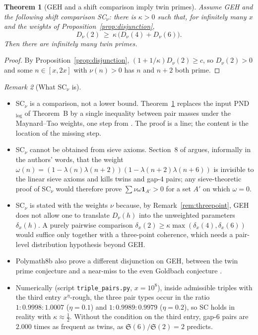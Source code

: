 \documentclass[11pt]{amsart}
\newtheorem{theorem}{Theorem}[section]
\theoremstyle{definition}
\theoremstyle{remark}
\newtheorem{remark}[theorem]{Remark}
\begin{document}
\begin{theorem}[GEH and a shift comparison imply twin primes]\label{thm:SC}
Assume GEH and the following \emph{shift comparison} SC$_\nu$: there is $\kappa>0$ such that, for infinitely many $x$ and the weights of Proposition~\ref{prop:disjunction},
\[
D_\nu(2)\ \ge\ \kappa\,\bigl(D_\nu(4)+D_\nu(6)\bigr).
\]
Then there are infinitely many twin primes.
\end{theorem}
\begin{proof}
By Proposition~\ref{prop:disjunction}, $(1+1/\kappa)D_\nu(2)\ge c$, so $D_\nu(2)>0$ and some $n\in[x,2x]$ with $\nu(n)>0$ has $n$ and $n+2$ both prime.
\end{proof}

\begin{remark}[What SC$_\nu$ is]\label{rem:SC}
\leavevmode
\begin{itemize}
\item SC$_\nu$ is a comparison, not a lower bound. Theorem~\ref{thm:SC} replaces the input PND$_{\log}$ of Theorem~B by a single inequality between pair masses under the Maynard--Tao weights, one step from \cite[Thm.~1.4(xii)]{Polymath8b}. The proof is a line; the content is the location of the missing step.
\item SC$_\nu$ cannot be obtained from sieve axioms. Section~8 of \cite{Polymath8b} argues, informally in the authors' words, that the weight $\omega(n)=(1-\lambda(n)\lambda(n+2))(1-\lambda(n+2)\lambda(n+6))$ is invisible to the linear sieve axioms and kills twins and gap-$4$ pairs; any sieve-theoretic proof of SC$_\nu$ would therefore prove $\sum\nu\omega\mathbf 1_{A'}>0$ for a set $A'$ on which $\omega=0$.
\item SC$_\nu$ is stated with the weights $\nu$ because, by Remark~\ref{rem:threepoint}, GEH does not allow one to translate $D_\nu(h)$ into the unweighted parameters $\delta_x(h)$. A purely pairwise comparison $\delta_x(2)\ge\kappa\max(\delta_x(4),\delta_x(6))$ would suffice only together with a three-point coherence, which needs a pair-level distribution hypothesis beyond GEH.
\item Polymath8b also prove a different disjunction on GEH, between the twin prime conjecture and a near-miss to the even Goldbach conjecture \cite[Thm.~1.5, Prop.~9.1]{Polymath8b}.
\item Numerically (script \texttt{triple\_pairs.py}, $x=10^8$), inside admissible triples with the third entry $x^\eta$-rough, the three pair types occur in the ratio $1:0.9998:1.0007$ ($\eta=0.1$) and $1:0.9989:0.9979$ ($\eta=0.2$), so SC holds in reality with $\kappa\approx\frac12$. Without the condition on the third entry, gap-$6$ pairs are $2.000$ times as frequent as twins, as $\mathfrak S(6)/\mathfrak S(2)=2$ predicts.
\end{itemize}
\end{remark}
\end{document}
